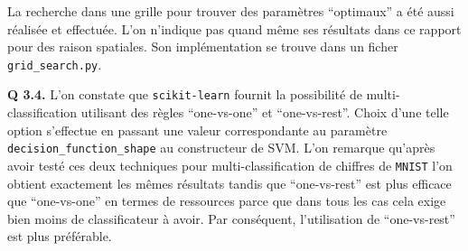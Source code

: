 \documentclass[a4paper,11pt]{article}
\theoremstyle{plain}
\theoremstyle{definition}
\begin{document}
La recherche dans une grille pour trouver des paramètres ``optimaux'' a été aussi réalisée et effectuée. L'on n'indique pas quand même ses résultats dans ce rapport pour des raison spatiales. Son implémentation se trouve dans un ficher \texttt{grid\_search.py}.

\textbf{Q 3.4.} L'on constate que \texttt{scikit-learn} fournit la possibilité de multi-classification utilisant des règles ``one-vs-one'' et ``one-vs-rest''. Choix d'une telle option s'effectue en passant une valeur correspondante au paramètre \texttt{decision\_function\_shape} au constructeur de SVM. L'on remarque qu'après avoir testé ces deux techniques pour multi-classification de chiffres de \texttt{MNIST} l'on obtient exactement les mêmes résultats tandis que ``one-vs-rest'' est plus efficace que ``one-vs-one'' en termes de ressources parce que dans tous les cas cela exige bien moins de classificateur à avoir. Par conséquent, l'utilisation de ``one-vs-rest'' est plus préférable.
\end{document}
